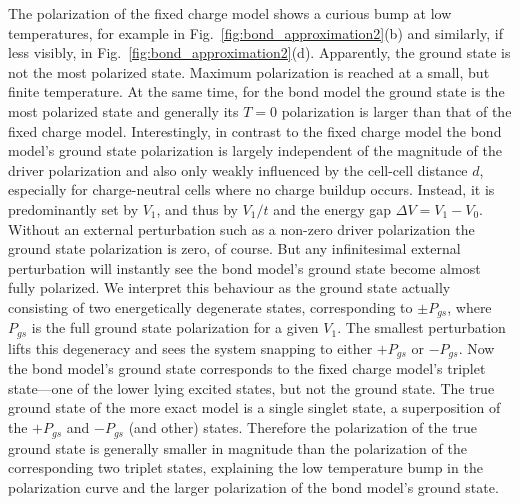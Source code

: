 The polarization of the fixed charge model shows a curious bump at low
temperatures, for example in Fig.~\ref{fig:bond_approximation2}(b) and
similarly, if less visibly, in Fig.~\ref{fig:bond_approximation2}(d).
Apparently, the ground state is not the most polarized state. Maximum
polarization is reached at a small, but finite temperature. At the same time,
for the bond model the ground state is the most polarized state and generally
its $T=0$ polarization is larger than that of the fixed charge model.
Interestingly, in contrast to the fixed charge model the bond model's ground
state polarization is largely independent of the magnitude of the driver
polarization and also only weakly influenced by the cell-cell distance $d$,
especially for charge-neutral cells where no charge buildup occurs. Instead, it
is predominantly set by $V_1$, and thus by $V_1/t$ and the energy gap $\Delta V
= V_1 - V_0$. Without an external perturbation such as a non-zero driver
polarization the ground state polarization is zero, of course. But any
infinitesimal external perturbation will instantly see the bond model's ground
state become almost fully polarized. We interpret this behaviour as the ground
state actually consisting of two energetically degenerate states, corresponding
to $\pm P_{gs}$, where $P_{gs}$ is the full ground state polarization for a
given $V_1$. The smallest perturbation lifts this degeneracy and sees the system
snapping to either $+P_{gs}$ or $-P_{gs}$. Now the bond model's ground state
corresponds to the fixed charge model's triplet state---one of the lower lying
excited states, but not the ground state. The true ground state of the more
exact model is a single singlet state, a superposition of the $+P_{gs}$ and
$-P_{gs}$ (and other) states. Therefore the polarization of the true ground
state is generally smaller in magnitude than the polarization of the
corresponding two triplet states, explaining the low temperature bump in the
polarization curve and the larger polarization of the bond model's ground state.

